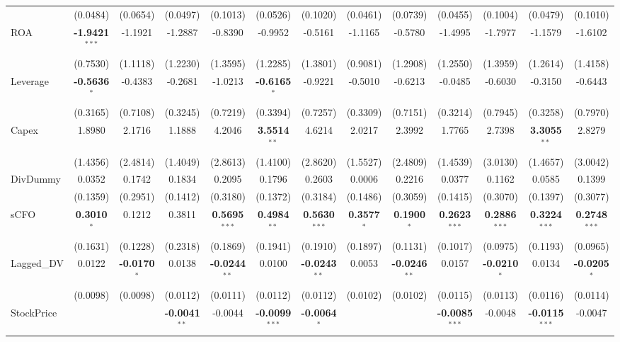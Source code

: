 \documentclass[11pt,a4paper]{article}
\begin{document}
\begin{table}[htbp]
\begin{tabular}{lcccccccccccc}
 & (0.0484) & (0.0654) & (0.0497) & (0.1013) & (0.0526) & (0.1020) & (0.0461) & (0.0739) & (0.0455) & (0.1004) & (0.0479) & (0.1010) \\
ROA & \textbf{-1.9421}$^{***}$ & -1.1921 & -1.2887 & -0.8390 & -0.9952 & -0.5161 & -1.1165 & -0.5780 & -1.4995 & -1.7977 & -1.1579 & -1.6102 \\
 & (0.7530) & (1.1118) & (1.2230) & (1.3595) & (1.2285) & (1.3801) & (0.9081) & (1.2908) & (1.2550) & (1.3959) & (1.2614) & (1.4158) \\
Leverage & \textbf{-0.5636}$^{*}$ & -0.4383 & -0.2681 & -1.0213 & \textbf{-0.6165}$^{*}$ & -0.9221 & -0.5010 & -0.6213 & -0.0485 & -0.6030 & -0.3150 & -0.6443 \\
 & (0.3165) & (0.7108) & (0.3245) & (0.7219) & (0.3394) & (0.7257) & (0.3309) & (0.7151) & (0.3214) & (0.7945) & (0.3258) & (0.7970) \\
Capex & 1.8980 & 2.1716 & 1.1888 & 4.2046 & \textbf{3.5514}$^{**}$ & 4.6214 & 2.0217 & 2.3992 & 1.7765 & 2.7398 & \textbf{3.3055}$^{**}$ & 2.8279 \\
 & (1.4356) & (2.4814) & (1.4049) & (2.8613) & (1.4100) & (2.8620) & (1.5527) & (2.4809) & (1.4539) & (3.0130) & (1.4657) & (3.0042) \\
DivDummy & 0.0352 & 0.1742 & 0.1834 & 0.2095 & 0.1796 & 0.2603 & 0.0006 & 0.2216 & 0.0377 & 0.1162 & 0.0585 & 0.1399 \\
 & (0.1359) & (0.2951) & (0.1412) & (0.3180) & (0.1372) & (0.3184) & (0.1486) & (0.3059) & (0.1415) & (0.3070) & (0.1397) & (0.3077) \\
sCFO & \textbf{0.3010}$^{*}$ & 0.1212 & 0.3811 & \textbf{0.5695}$^{***}$ & \textbf{0.4984}$^{**}$ & \textbf{0.5630}$^{***}$ & \textbf{0.3577}$^{*}$ & \textbf{0.1900}$^{*}$ & \textbf{0.2623}$^{***}$ & \textbf{0.2886}$^{***}$ & \textbf{0.3224}$^{***}$ & \textbf{0.2748}$^{***}$ \\
 & (0.1631) & (0.1228) & (0.2318) & (0.1869) & (0.1941) & (0.1910) & (0.1897) & (0.1131) & (0.1017) & (0.0975) & (0.1193) & (0.0965) \\
Lagged\_DV & 0.0122 & \textbf{-0.0170}$^{*}$ & 0.0138 & \textbf{-0.0244}$^{**}$ & 0.0100 & \textbf{-0.0243}$^{**}$ & 0.0053 & \textbf{-0.0246}$^{**}$ & 0.0157 & \textbf{-0.0210}$^{*}$ & 0.0134 & \textbf{-0.0205}$^{*}$ \\
 & (0.0098) & (0.0098) & (0.0112) & (0.0111) & (0.0112) & (0.0112) & (0.0102) & (0.0102) & (0.0115) & (0.0113) & (0.0116) & (0.0114) \\
StockPrice &  &  & \textbf{-0.0041}$^{**}$ & -0.0044 & \textbf{-0.0099}$^{***}$ & \textbf{-0.0064}$^{*}$ &  &  & \textbf{-0.0085}$^{***}$ & -0.0048 & \textbf{-0.0115}$^{***}$ & -0.0047 \\

\end{tabular}
\end{table}
\end{document}
